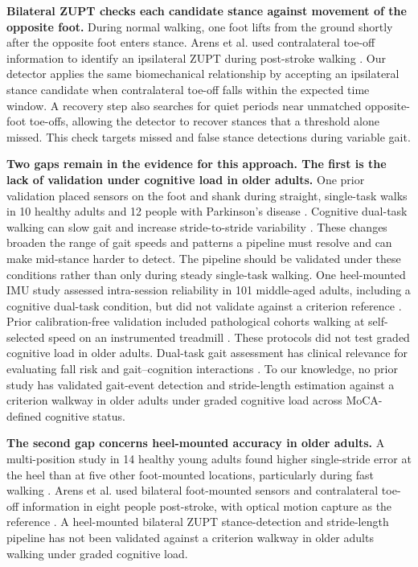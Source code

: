 \documentclass[fleqn,10pt,lineno]{wlpeerj}
\begin{document}
\textbf{Bilateral ZUPT checks each candidate stance against movement of the opposite foot.}
During normal walking, one foot lifts from the ground shortly after the opposite foot enters stance. Arens et al. used contralateral toe-off information to identify an ipsilateral ZUPT during post-stroke walking \citep{Arens2021}. Our detector applies the same biomechanical relationship by accepting an ipsilateral stance candidate when contralateral toe-off falls within the expected time window. A recovery step also searches for quiet periods near unmatched opposite-foot toe-offs, allowing the detector to recover stances that a threshold alone missed. This check targets missed and false stance detections during variable gait.

\textbf{Two gaps remain in the evidence for this approach. The first is the lack of validation under cognitive load in older adults.}
One prior validation placed sensors on the foot and shank during straight, single-task walks in 10 healthy adults and 12 people with Parkinson's disease \citep{Sijobert2015}. Cognitive dual-task walking can slow gait and increase stride-to-stride variability \citep{Beauchet2005, Yogev-Seligmann2008, Hausdorff2008}. These changes broaden the range of gait speeds and patterns a pipeline must resolve and can make mid-stance harder to detect. The pipeline should be validated under these conditions rather than only during steady single-task walking. One heel-mounted IMU study assessed intra-session reliability in 101 middle-aged adults, including a cognitive dual-task condition, but did not validate against a criterion reference \citep{Boutaayamou2025}. Prior calibration-free validation included pathological cohorts walking at self-selected speed on an instrumented treadmill \citep{Laidig2021}. These protocols did not test graded cognitive load in older adults. Dual-task gait assessment has clinical relevance for evaluating fall risk and gait--cognition interactions \citep{Montero-Odasso2012, Commandeur2018, Springer2006}. To our knowledge, no prior study has validated gait-event detection and stride-length estimation against a criterion walkway in older adults under graded cognitive load across MoCA-defined cognitive status.

\textbf{The second gap concerns heel-mounted accuracy in older adults.}
A multi-position study in 14 healthy young adults found higher single-stride error at the heel than at five other foot-mounted locations, particularly during fast walking \citep{Kuderle2022}. Arens et al. used bilateral foot-mounted sensors and contralateral toe-off information in eight people post-stroke, with optical motion capture as the reference \citep{Arens2021}. A heel-mounted bilateral ZUPT stance-detection and stride-length pipeline has not been validated against a criterion walkway in older adults walking under graded cognitive load.
\end{document}
